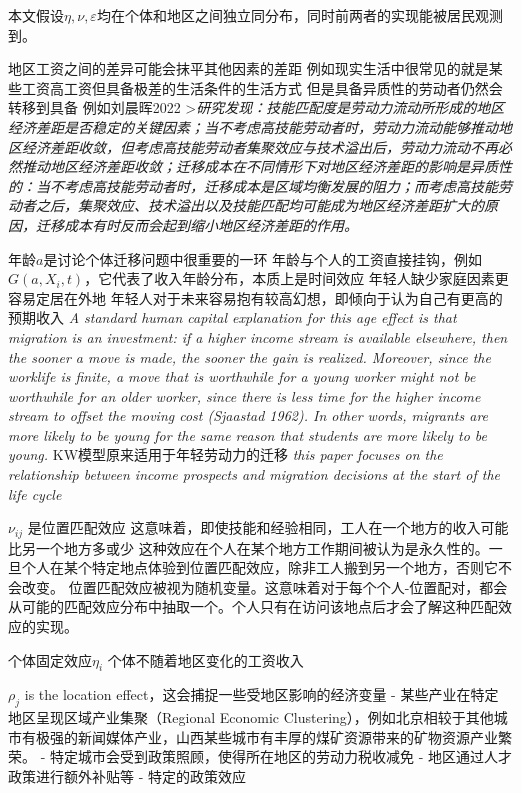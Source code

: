 \documentclass[a4paper,12pt]{article}
\begin{document}
本文假设$\eta,\nu,\varepsilon$均在个体和地区之间独立同分布，同时前两者的实现能被居民观测到。

地区工资之间的差异可能会抹平其他因素的差距
例如现实生活中很常见的就是某些工资高工资但具备极差的生活条件的生活方式
但是具备异质性的劳动者仍然会转移到具备
例如刘晨晖2022
>\textit{研究发现：技能匹配度是劳动力流动所形成的地区经济差距是否稳定的关键因素；当不考虑高技能劳动者时，劳动力流动能够推动地区经济差距收敛，但考虑高技能劳动者集聚效应与技术溢出后，劳动力流动不再必然推动地区经济差距收敛；迁移成本在不同情形下对地区经济差距的影响是异质性的：当不考虑高技能劳动者时，迁移成本是区域均衡发展的阻力；而考虑高技能劳动者之后，集聚效应、技术溢出以及技能匹配均可能成为地区经济差距扩大的原因，迁移成本有时反而会起到缩小地区经济差距的作用。}

年龄$a$是讨论个体迁移问题中很重要的一环
年龄与个人的工资直接挂钩，例如$G(a,X_i,t)$，它代表了收入年龄分布，本质上是时间效应
年轻人缺少家庭因素更容易定居在外地
年轻人对于未来容易抱有较高幻想，即倾向于认为自己有更高的预期收入
\textit{A standard human capital explanation for this age effect is that migration is an investment: if a higher income stream is  available elsewhere, then the sooner a move is made, the sooner the gain is realized. Moreover,  since the worklife is finite, a move that is worthwhile for a young worker might not be  worthwhile for an older worker, since there is less time for the higher income stream to offset  the moving cost (Sjaastad 1962). In other words, migrants are more likely to be young for the same reason that students are more likely to be young.}
KW模型原来适用于年轻劳动力的迁移
\textit{this paper focuses on the relationship between income prospects and migration decisions at the start of the life cycle}



$\nu_{ij}$ 是位置匹配效应
这意味着，即使技能和经验相同，工人在一个地方的收入可能比另一个地方多或少
这种效应在个人在某个地方工作期间被认为是永久性的。一旦个人在某个特定地点体验到位置匹配效应，除非工人搬到另一个地方，否则它不会改变。
位置匹配效应被视为随机变量。这意味着对于每个个人-位置配对，都会从可能的匹配效应分布中抽取一个。个人只有在访问该地点后才会了解这种匹配效应的实现。



个体固定效应$\eta_i$
个体不随着地区变化的工资收入



$\rho_j$ is the location effect，这会捕捉一些受地区影响的经济变量
- 某些产业在特定地区呈现区域产业集聚（Regional Economic Clustering），例如北京相较于其他城市有极强的新闻媒体产业，山西某些城市有丰厚的煤矿资源带来的矿物资源产业繁荣。
- 特定城市会受到政策照顾，使得所在地区的劳动力税收减免
- 地区通过人才政策进行额外补贴等
- 特定的政策效应
\end{document}

